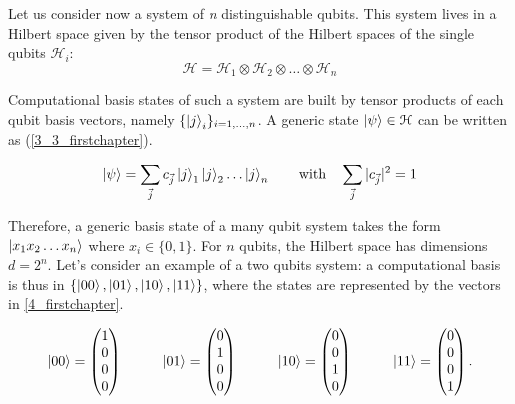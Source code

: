 Let us consider now a system of  \textit{n} distinguishable qubits. This system lives in a Hilbert space given by the tensor product of the Hilbert spaces of the single qubits $\mathcal{H}_i$:
\begin{equation}
\mathcal{H}= \mathcal{H}_1 \otimes \mathcal{H}_2 \otimes \dots \otimes \mathcal{H}_n
\label{3_2_firstchapter}
\end{equation}

\noindent Computational basis states of such a system are built by tensor products of each qubit basis vectors, namely $\{ \left| j \right \rangle_i \} _{i=1,\dots,n}$. A generic state $\left| \psi \right \rangle \in \mathcal{H}$ can be written as (\ref{3_3_firstchapter}).

\begin{equation}
\left| \psi \right \rangle= \sum_{\vec{j}} c_{\vec{j}} \left| j \right \rangle_1 \left| j \right \rangle_2 \dots \left| j \right \rangle_n \qquad \text{with} \quad  \sum_{\vec{j}} |c_{\vec{j}}|^2 = 1
\label{3_3_firstchapter}
\end{equation}

\noindent Therefore, a generic basis state of a many qubit system takes the form $\left| x_1  x_2  \dots x_n \right \rangle$ where $x_i \in \{0,1\}$. For $n$ qubits, the Hilbert space has dimensions $d=2^n$. 
Let's consider an example of a two qubits system: a computational basis is thus in $\{\left| 00 \right \rangle,\left| 01 \right \rangle,\left| 10 \right \rangle,\left| 11 \right \rangle\}$, where the states are represented by the vectors in \ref{4_firstchapter}.

\begin{equation}
\left| 00 \right \rangle = \begin{pmatrix} 1 \\ 0 \\ 0 \\ 0 \end{pmatrix} \hspace{1cm} \left| 01 \right \rangle = \begin{pmatrix} 0 \\ 1 \\ 0 \\ 0  \end{pmatrix} \hspace{1cm} \left| 10 \right \rangle = \begin{pmatrix} 0 \\ 0 \\ 1 \\ 0  \end{pmatrix} \hspace{1cm} \left| 11 \right \rangle = \begin{pmatrix} 0 \\ 0 \\ 0 \\ 1  \end{pmatrix}.
\label{4_firstchapter}
\end{equation}
 
